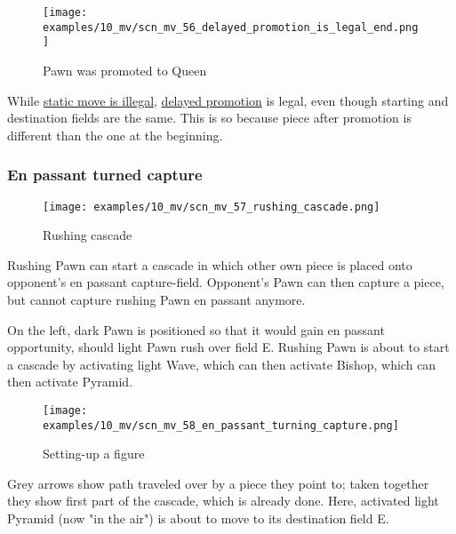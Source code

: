 \noindent
\begin{figure}[!h]
\texttt{[image: examples/10\_mv/scn\_mv\_56\_delayed\_promotion\_is\_legal\_end.png]}
\caption{Pawn was promoted to Queen}
\label{fig:scn_mv_56_delayed_promotion_is_legal_end}
\end{figure}

While \hyperref[fig:scn_mv_51_static_move_is_illegal_init]{static move is illegal},
\hyperref[sec:Age of Aquarius/Promotion]{delayed promotion} is legal, even though
starting and destination fields are the same. This is so because piece after
promotion is different than the one at the beginning.

\clearpage %

\subsubsection*{En passant turned capture}
\label{sec:Miranda's veil/Wave/Cascading Waves/En passant turned capture}

\vspace*{-0.7\baselineskip}
\noindent
\begin{wrapfigure}[15]{l}{0.4\textwidth}
\centering
\texttt{[image: examples/10\_mv/scn\_mv\_57\_rushing\_cascade.png]}
\vspace*{-1.4\baselineskip}
\caption{Rushing cascade}
\label{fig:scn_mv_57_rushing_cascade}
\end{wrapfigure}
Rushing Pawn can start a cascade in which other own piece is placed onto opponent's
en passant capture-field.
Opponent's Pawn can then capture a piece, but cannot capture rushing Pawn en passant
anymore.

On the left, dark Pawn is positioned so that it would gain en passant opportunity,
should light Pawn rush over field E. Rushing Pawn is about to start a cascade by
activating light Wave, which can then activate Bishop, which can then activate
Pyramid.


\noindent
\begin{wrapfigure}[7]{l}{0.4\textwidth}
\centering
\texttt{[image: examples/10\_mv/scn\_mv\_58\_en\_passant\_turning\_capture.png]}
\vspace*{-1.4\baselineskip}
\caption{Setting-up a figure}
\label{fig:scn_mv_58_en_passant_turning_capture}
\end{wrapfigure}
Grey arrows show path traveled over by a piece they point to; taken together they
show first part of the cascade, which is already done. \newline
\indent
Here, activated light Pyramid (now "in the air") is about to move to its destination
field E.

